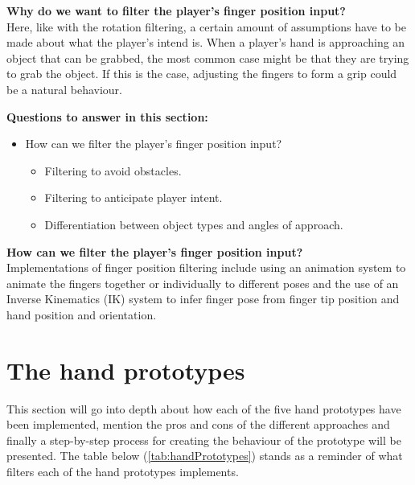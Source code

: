\textbf{Why do we want to filter the player's finger position input?}\\
Here, like with the rotation filtering, a certain amount of assumptions have to be made about what the player's intend is. When a player's hand is approaching an object that can be grabbed, the most common case might be that they are trying to grab the object. If this is the case, adjusting the fingers to form a grip could be a natural behaviour.


\textbf{Questions to answer in this section:}
\begin{itemize}
\setlength\itemsep{-0.1cm}
\item How can we filter the player's finger position input?
\begin{itemize}
\setlength\itemsep{-0.1cm}
\item Filtering to avoid obstacles.
\item Filtering to anticipate player intent.
\item Differentiation between object types and angles of approach.
\end{itemize}
\end{itemize}

\textbf{How can we filter the player's finger position input?}\\
Implementations of finger position filtering include using an animation system to animate the fingers together or individually to different poses and the use of an Inverse Kinematics (IK) system to infer finger pose from finger tip position and hand position and orientation.


\section{The hand prototypes}
\label{sec:handPrototypes}
This section will go into depth about how each of the five hand prototypes have been implemented, mention the pros and cons of the different approaches and finally a step-by-step process for creating the behaviour of the prototype will be presented. The table below (\ref{tab:handPrototypes}) stands as a reminder of what filters each of the hand prototypes implements.

